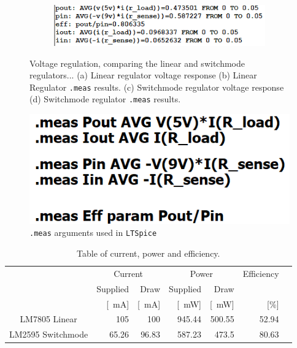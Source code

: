 \begin{figure}[H]
\begin{subfigure}[]{0.5\textwidth}
		    \caption{} \label{subfig:swmd_volt_response}
     \end{subfigure}
    \begin{subfigure}[]{0.4\textwidth}
              \centering
  		\includegraphics[width=1\linewidth]{./Figures/Pictures/VoltRegLM2595MeasResults}
		    \caption{} \label{subfig:swmd_meas_results}
     \end{subfigure}
   \caption[\textcolor{red}{I am the short caption that appears in the List of Figures list}]{Voltage regulation, comparing the linear and switchmode regulators... (a) Linear regulator voltage response (b) Linear Regulator \texttt{.meas} results.  (c)  Switchmode regulator voltage response (d) Switchmode regulator \texttt{.meas} results.}
    \label{fig:simulation_results_box}
 \end{figure}

\begin{figure}[H]
     \centering
     \includegraphics[width=0.35\linewidth]{./Figures/Pictures/VoltRegMeasureArguments.png}
     \caption{\texttt{.meas} arguments used in \texttt{LTSpice}}
     \label{fig:measargs}
 \end{figure}

\begin{table}[H]
        \centering
        \footnotesize
        \caption{Table of current, power and efficiency.}
         \begin{tabular}{c@{\qquad}rrrrrr}
          \toprule
             \multirow{2}{*}{} & \multicolumn{2}{c}{Current} & \multicolumn{2}{c}{Power}& Efficiency\\
          \cmidrule{2-5}
          & Supplied & Draw & Supplied & Draw &\\
          & [\SI{}{\milli\ampere}] & [\SI{}{\milli\ampere}]& [\SI{}{\milli\watt}]& [\SI{}{\milli\watt}]&[\%]\\
          \midrule
          LM7805 Linear & 105 & 100 & 945.44 & 500.55 & 52.94\\
          LM2595 Switchmode & 65.26 & 96.83 & 587.23 & 473.5 & 80.63 \\
          \bottomrule
        \end{tabular}
     \label{tab:voltregresults}
\end{table}

